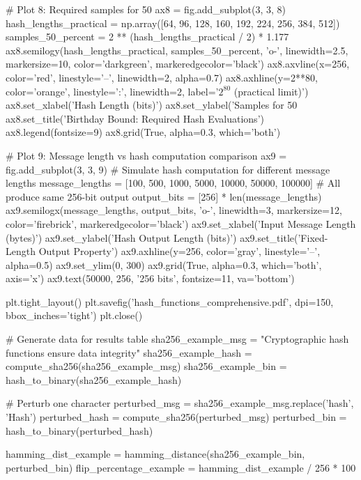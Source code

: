 \documentclass[a4paper, 11pt]{article}
\begin{document}
\begin{pycode}
# Plot 8: Required samples for 50%
ax8 = fig.add_subplot(3, 3, 8)
hash_lengths_practical = np.array([64, 96, 128, 160, 192, 224, 256, 384, 512])
samples_50_percent = 2 ** (hash_lengths_practical / 2) * 1.177
ax8.semilogy(hash_lengths_practical, samples_50_percent, 'o-', linewidth=2.5,
             markersize=10, color='darkgreen', markeredgecolor='black')
ax8.axvline(x=256, color='red', linestyle='--', linewidth=2, alpha=0.7)
ax8.axhline(y=2**80, color='orange', linestyle=':', linewidth=2,
            label='$2^{80}$ (practical limit)')
ax8.set_xlabel('Hash Length (bits)')
ax8.set_ylabel('Samples for 50\\%
ax8.set_title('Birthday Bound: Required Hash Evaluations')
ax8.legend(fontsize=9)
ax8.grid(True, alpha=0.3, which='both')

# Plot 9: Message length vs hash computation comparison
ax9 = fig.add_subplot(3, 3, 9)
# Simulate hash computation for different message lengths
message_lengths = [100, 500, 1000, 5000, 10000, 50000, 100000]
# All produce same 256-bit output
output_bits = [256] * len(message_lengths)
ax9.semilogx(message_lengths, output_bits, 'o-', linewidth=3, markersize=12,
             color='firebrick', markeredgecolor='black')
ax9.set_xlabel('Input Message Length (bytes)')
ax9.set_ylabel('Hash Output Length (bits)')
ax9.set_title('Fixed-Length Output Property')
ax9.axhline(y=256, color='gray', linestyle='--', alpha=0.5)
ax9.set_ylim(0, 300)
ax9.grid(True, alpha=0.3, which='both', axis='x')
ax9.text(50000, 256, '256 bits', fontsize=11, va='bottom')

plt.tight_layout()
plt.savefig('hash_functions_comprehensive.pdf', dpi=150, bbox_inches='tight')
plt.close()

# Generate data for results table
sha256_example_msg = "Cryptographic hash functions ensure data integrity"
sha256_example_hash = compute_sha256(sha256_example_msg)
sha256_example_bin = hash_to_binary(sha256_example_hash)

# Perturb one character
perturbed_msg = sha256_example_msg.replace('hash', 'Hash')
perturbed_hash = compute_sha256(perturbed_msg)
perturbed_bin = hash_to_binary(perturbed_hash)

hamming_dist_example = hamming_distance(sha256_example_bin, perturbed_bin)
flip_percentage_example = hamming_dist_example / 256 * 100
\end{pycode}
\end{document}
